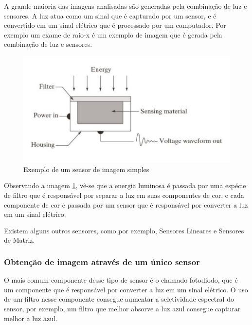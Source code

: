 \documentclass[12pt]{article}
\begin{document}
    A grande maioria das imagens analisadas são generadas pela combinação de luz e sensores. A luz
    atua como um sinal que é capturado por um sensor, e é convertido em um sinal elétrico que é
    processado por um computador. Por exemplo um exame de raio-x é um exemplo de imagem que é gerada
    pela combinação de luz e sensores.

    \begin{figure}[H]
        \centering
        \includegraphics[]{images/16.png}
        \caption{Exemplo de um sensor de imagem simples}
        \label{fig:sensor}
    \end{figure}

    Observando a imagem \ref{fig:sensor}, vê-se que a energia luminosa é passada por uma espécie de filtro que
    é responsável por separar a luz em suas componentes de cor, e cada componente de cor é passada
    por um sensor que é responsável por converter a luz em um sinal elétrico.

    Existem alguns outros sensores, como por exemplo, Sensores Lineares e Sensores de Matriz.


    \subsubsection{Obtenção de imagem através de um único sensor}

    O mais comum componente desse tipo de sensor é o chamado fotodiodo, que é um componente que é
    responsável por converter a luz em um sinal elétrico. O uso de um filtro nesse componente consegue
    aumentar a seletividade espectral do sensor, por exemplo, um filtro que melhor absorve a luz azul
    consegue capturar melhor a luz azul.
\end{document}
